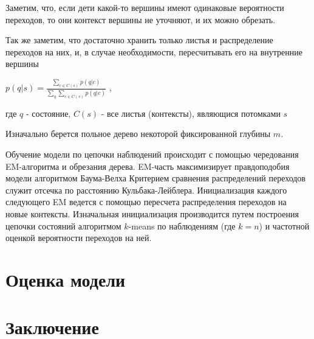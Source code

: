 \documentclass[10pt,a4paper]{article}
\begin{document}
Заметим, что, если дети какой-то вершины имеют одинаковые вероятности переходов, то они контекст вершины не уточняют, и их можно обрезать.

Так же заметим, что достаточно хранить только листья и распределение переходов на них, и, в случае необходимости, пересчитывать его на внутренние вершины 

$ p(q|s) = \frac{\sum_{c \in C(s)} {p(q|c)}}{\sum_q\sum_{c \in C(s)} {p(q|c)}} $ ,

где $ q $ - состояние, $ C(s )$ - все листья (контексты), являющися потомками $ s $

Изначально берется польное дерево некоторой фиксированной глубины $m$.

Обучение модели по цепочки наблюдений происходит с помощью чередования EM-алгоритма и обрезания дерева. 
EM-часть максимизирует правдоподобия модели алгоритмом Баума-Велха
Критерием сравнения распределений переходов служит отсечка по расстоянию Кульбака-Лейблера.
Инициализация каждого следующего EM ведется с помощью пересчета распределения переходов на новые контексты.
Изначальная инициализация производится путем построения цепочки состояний алгоритмом $ k $-means по наблюдениям (где $k=n$) и частотной оценкой вероятности переходов на ней.

\section{Оценка модели}

\section{Заключение}



\end{document}
